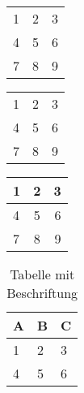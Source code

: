 \begin{tabular}{ l c r }
  1 & 2 & 3 \\
  4 & 5 & 6 \\
  7 & 8 & 9 \\
\end{tabular}

\begin{tabular}{ l | c || r }
  1 & 2 & 3 \\
  4 & 5 & 6 \\
  7 & 8 & 9 \\
\end{tabular}

\begin{center}
  \begin{tabular}{ | l || c ||| r }
    \hline
    1 & 2 & 3 \\ \hline
    4 & 5 & 6 \\ \hline \hline
    7 & 8 & 9 \\
    \hline
  \end{tabular}
\end{center}

\begin{table}[ht]
\centering
\begin{tabular}{l | l | l}
A & B & C \\
\hline
1 & 2 & 3 \\
4 & 5 & 6
\end{tabular}
\caption{Tabelle mit Beschriftung}
\label{tab:abc}
\end{table}

